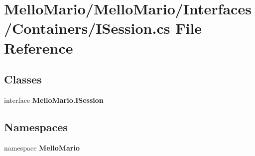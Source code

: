 \section{Mello\+Mario/\+Mello\+Mario/\+Interfaces/\+Containers/\+I\+Session.cs File Reference}
\label{ISession_8cs}
\subsection*{Classes}
\begin{DoxyCompactItemize}
\item 
interface \textbf{ Mello\+Mario.\+I\+Session}
\end{DoxyCompactItemize}
\subsection*{Namespaces}
\begin{DoxyCompactItemize}
\item 
namespace \textbf{ Mello\+Mario}
\end{DoxyCompactItemize}
